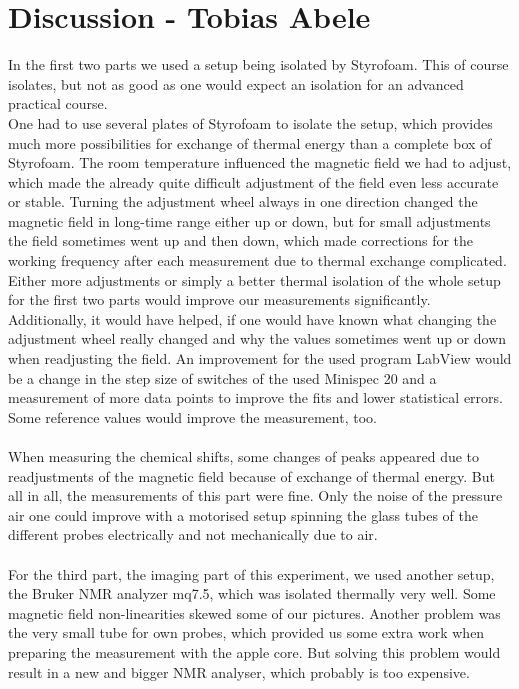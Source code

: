 \section{Discussion - Tobias Abele}
In the first two parts we used a setup being isolated by Styrofoam. This of course isolates, but not as good as one would expect an isolation for an advanced practical course.\\
One had to use several plates of Styrofoam to isolate the setup, which provides much more possibilities for exchange of thermal energy than a complete box of Styrofoam. The room temperature influenced the magnetic field we had to adjust, which made the already quite difficult adjustment of the field even less accurate or stable. Turning the adjustment wheel always in one direction changed the magnetic field in long-time range either up or down, but for small adjustments the field sometimes went up and then down, which made corrections for the working frequency after each measurement due to thermal exchange complicated.
Either more adjustments or simply a better thermal isolation of the whole setup for the first two parts would improve our measurements significantly. Additionally, it would have helped, if one would have known what changing the adjustment wheel really changed and why the values sometimes went up or down when readjusting the field.
An improvement for the used program LabView would be a change in the step size of switches of the used Minispec 20 and a measurement of more data points to improve the fits and lower statistical errors.\\
Some reference values would improve the measurement, too.\\
\\
\noindent
When measuring the chemical shifts, some changes of peaks appeared due to readjustments of the magnetic field because of exchange of thermal energy. But all in all, the measurements of this part were fine. Only the noise of the pressure air one could improve with a motorised setup spinning the glass tubes of the different probes electrically and not mechanically due to air.\\
\\
For the third part, the imaging part of this experiment, we used another setup, the Bruker NMR analyzer mq7.5, which was isolated thermally very well. Some magnetic field non-linearities skewed some of our pictures. Another problem was the very small tube for own probes, which provided us some extra work when preparing the measurement with the apple core. But solving this problem would result in a new and bigger NMR analyser, which probably is too expensive. 
